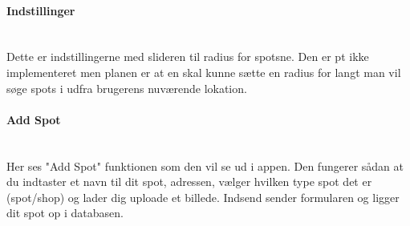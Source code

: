 \documentclass[12pt]{article}
\begin{document}
\paragraph{Indstillinger}\mbox{}\\
Dette er indstillingerne med slideren til radius for spotsne. Den er pt ikke implementeret men planen er at en skal kunne sætte en radius for langt man vil søge spots i udfra brugerens nuværende lokation.\\
\paragraph{Add Spot}\mbox{}\\
Her ses "Add Spot" funktionen som den vil se ud i appen. Den fungerer sådan at du indtaster et navn til dit spot, adressen, vælger hvilken type spot det er (spot/shop) og lader dig uploade et billede. Indsend sender formularen og ligger dit spot op i databasen.\\
\end{document}
